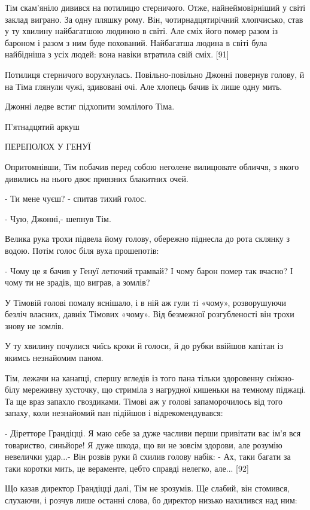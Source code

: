 Тім скам'яніло дивився на потилицю стерничого. Отже, найнеймовірніший у світі заклад виграно. За одну пляшку рому. Він, чотирнадцятирічний хлопчисько, став у ту хвилину найбагатшою людиною в світі. Але сміх його помер разом із бароном і разом з ним буде похований. Найбагатша людина в світі була найбідніша з усіх людей: вона навіки втратила свій сміх. [91]

Потилиця стерничого ворухнулась. Повільно-повільно Джонні повернув голову, й на Тіма глянули чужі, здивовані очі. Але хлопець бачив їх лише одну мить.

Джонні ледве встиг підхопити зомлілого Тіма.

П'ятнадцятий аркуш

ПЕРЕПОЛОХ У ГЕНУЇ

Опритомнівши, Тім побачив перед собою неголене вилицювате обличчя, з якого дивились на нього двоє приязних блакитних очей.

- Ти мене чуєш? - спитав тихий голос.

- Чую, Джонні,- шепнув Тім.

Велика рука трохи підвела йому голову, обережно піднесла до рота склянку з водою. Потім голос біля вуха прошепотів:

- Чому це я бачив у Генуї летючий трамвай? І чому барон помер так вчасно? І чому ти не зрадів, що виграв, а зомлів?

У Тімовій голові помалу яснішало, і в ній аж гули ті «чому», розворушуючи безліч власних, давніх Тімових «чому». Від безмежної розгубленості він трохи знову не зомлів.

У ту хвилину почулися чиїсь кроки й голоси, й до рубки ввійшов капітан із якимсь незнайомим паном.

Тім, лежачи на канапці, спершу вгледів із того пана тільки здоровенну сніжно-білу мереживну хусточку, що стриміла з нагрудної кишеньки на темному піджаці. Та ще враз запахло гвоздиками. Тімові аж у голові запаморочилось від того запаху, коли незнайомий пан підійшов і відрекомендувався:

- Діретторе Грандіцці. Я маю себе за дуже часливи перши привітати вас ім'я вся товариство, синьйоре! Я дуже шкода, що ви не зовсім здорови, але розумію невелички удар...- Він розвів руки й схилив голову набік: - Ах, таки багати за таки коротки мить, це вераменте, цебто справді нелегко, але... [92]

Що казав директор Грандіцці далі, Тім не зрозумів. Ще слабий, він стомився, слухаючи, і розчув лише останні слова, бо директор низько нахилився над ним:

